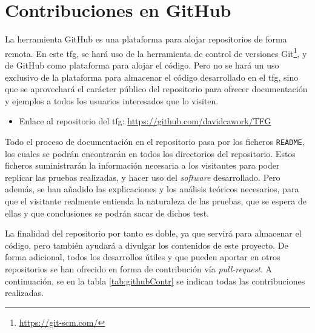 \section{Contribuciones en GitHub}
\label{sec:estadoArte_github}


La herramienta GitHub \cite{github2016github} es una plataforma para alojar repositorios de forma remota. En este \gls{tfg}, se hará uso de la herramienta de control de versiones Git\footnote{\url{https://git-scm.com/}}, y de GitHub como plataforma para alojar el código. Pero no se hará un uso exclusivo de la plataforma para almacenar el código desarrollado en el \gls{tfg}, sino que se aprovechará el carácter público del repositorio para ofrecer documentación y ejemplos a todos los usuarios interesados que lo visiten. \\
\par
\begin{itemize}
    \item Enlace al repositorio del \gls{tfg}: \url{https://github.com/davidcawork/TFG} 
\end{itemize}
\vspace{0.5cm}
Todo el proceso de documentación en el repositorio pasa por los ficheros \texttt{README}, los cuales se podrán encontrarán en todos los directorios del repositorio. Estos ficheros suministrarán la información necesaria a los visitantes para poder replicar las pruebas realizadas, y hacer uso del \textit{software} desarrollado. Pero además, se han añadido las explicaciones y  los análisis teóricos necesarios, para que el visitante realmente entienda la naturaleza de las pruebas, que se espera de ellas y que conclusiones se podrán sacar de dichos test.  \\
\par

La finalidad del repositorio por tanto es doble, ya que servirá para almacenar el código, pero también ayudará a divulgar los contenidos de este proyecto. De forma adicional, todos los desarrollos útiles y que pueden aportar en otros repositorios se han ofrecido en forma de contribución vía \textit{pull-request}. A continuación, se en la tabla \ref{tab:githubContr} se indican  todas las contribuciones realizadas.\\
\par

